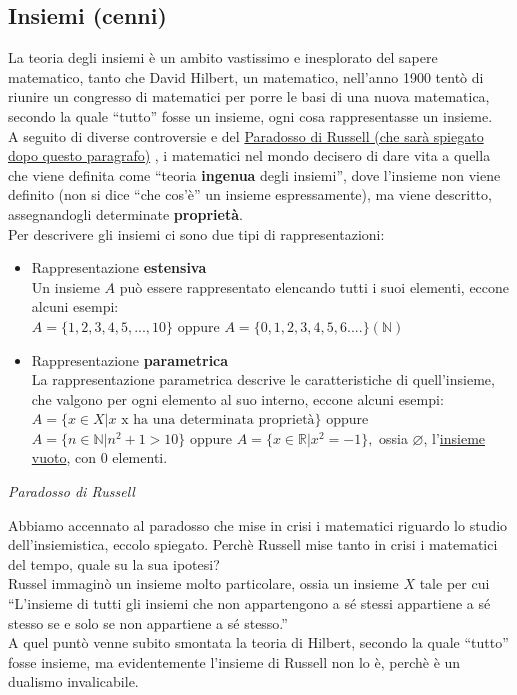 \documentclass{article}
\theoremstyle{definition}
\newcommand{\virgolette}[1]{``#1''}
\begin{document}
\begin{itemize}
\section{Insiemi (cenni)}
La teoria degli insiemi è un ambito vastissimo e inesplorato del sapere matematico, tanto che David Hilbert, un matematico, nell'anno 1900 tentò di riunire un congresso di matematici per porre le basi di una nuova matematica, secondo la quale \virgolette{tutto} fosse un insieme, ogni cosa rappresentasse un insieme.
\\ A seguito di diverse controversie e del \underline{Paradosso di Russell (che sarà spiegato dopo questo paragrafo)} , i matematici nel mondo decisero di dare vita a quella che viene definita come \virgolette{teoria \textbf{ingenua} degli insiemi}, dove l'insieme non viene definito (non si dice \virgolette{che cos'è} un insieme espressamente), ma viene descritto, assegnandogli determinate \textbf{proprietà}.
\\ Per descrivere gli insiemi ci sono due tipi di rappresentazioni:
\\
\begin{itemize}
    \item Rappresentazione \textbf{estensiva}
    \\ Un insieme $A$ può essere rappresentato elencando tutti i suoi elementi, eccone alcuni esempi:
    \\ $A=\{1,2,3,4,5,...,10\}$ oppure $A=\{0,1,2,3,4,5,6....\}(\mathbb{N})$
    \item Rappresentazione \textbf{parametrica}
    \\ La rappresentazione parametrica descrive le caratteristiche di quell'insieme, che valgono per ogni elemento al suo interno, eccone alcuni esempi:
    \\
    $A=\{x \in X|x \,\, \mbox{x ha una determinata proprietà}\}$ oppure $A=\{n \in \mathbb{N} | n^2+1>10\}$ oppure $A=\{x \in \mathbb{R}| x^2=-1\},$ ossia $\varnothing$, l'\underline{insieme vuoto}, con 0 elementi.
\end{itemize}

\begin{center}
    \textit{Paradosso di Russell}
\end{center}
Abbiamo accennato al paradosso che mise in crisi i matematici riguardo lo studio dell'insiemistica, eccolo spiegato. Perchè Russell mise tanto in crisi i matematici del tempo, quale su la sua ipotesi?
\\ Russel immaginò un insieme molto particolare, ossia un insieme $X$ tale per cui \virgolette{L'insieme di tutti gli insiemi che non appartengono a sé stessi appartiene a sé stesso se e solo se non appartiene a sé stesso.}
\\ A quel puntò venne subito smontata la teoria di Hilbert, secondo la quale \virgolette{tutto} fosse insieme, ma evidentemente l'insieme di Russell non lo è, perchè è un dualismo invalicabile.

    \end{itemize}
\end{document}
